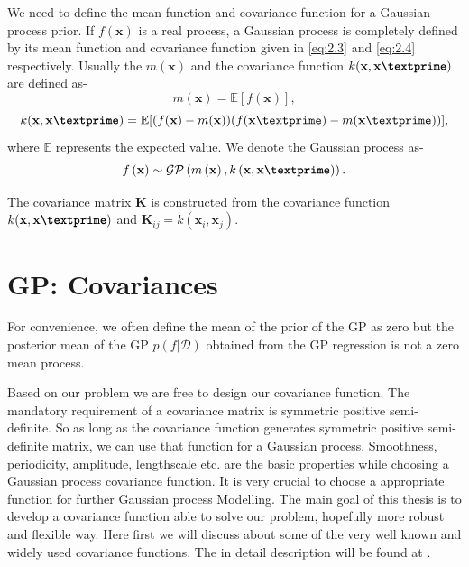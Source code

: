 We need to define the mean function and covariance function for a Gaussian process prior.
If $f(\textbf{x})$ is a real process, a Gaussian process is completely defined by its mean function
and covariance function given in \ref{eq:2.3} and \ref{eq:2.4} respectively.
Usually the $m(\textbf{x})$  and the covariance function $k(\textbf{x},\textbf{x\textprime})$
are defined as-
\begin{equation} \label{eq:2.3}
m(\textbf{x})= \mathbb{E}[f(\textbf{x})],
\end{equation}
\begin{equation} \label{eq:2.4}
k(\textbf{x},\textbf{x\textprime})= 
\mathbb{E}[(f(\textbf{x})-m(\textbf{x}))(f(\textbf{x}\textprime)-m(\textbf{x}\textprime))],
\end{equation}
where $\mathbb{E}$ represents the expected value.
We denote the Gaussian process as-
\begin{equation} \label{eq:GP}
f\left(\textbf{x} \right)\sim \mathcal{GP} \left(m \left(\textbf{x}\right), k \left(\textbf{x},\textbf{x\textprime}\right) \right).
\end{equation}

The covariance matrix $\textbf{K}$ is constructed from the covariance function
$k(\textbf{x},\textbf{x\textprime})$ and 
$\textbf{K}_{ij}=k(\textbf{x}_i,\textbf{x}_j)$.

\section{GP: Covariances}
For convenience, we often define the mean of the prior of the GP as zero but the
posterior mean of the GP $p(f|\mathcal{D})$ obtained from the GP regression is not a zero
mean process.

Based on our problem we are free to design our covariance function. The mandatory requirement 
of a covariance matrix is symmetric positive semi-definite. So as long as the covariance function
generates symmetric positive semi-definite matrix, we can use that function for a Gaussian process.
Smoothness, periodicity, amplitude, lengthscale etc. are the basic properties while choosing 
a Gaussian process covariance function. It is very crucial to choose a appropriate function
for further Gaussian process Modelling. The main goal of this thesis is to develop a
covariance function able to solve our problem, hopefully more robust and flexible way.
Here first we will discuss about some of the very well known and widely used covariance
functions. The in detail description will be found at \cite{Rasmussen_and_Williams:2006}.


